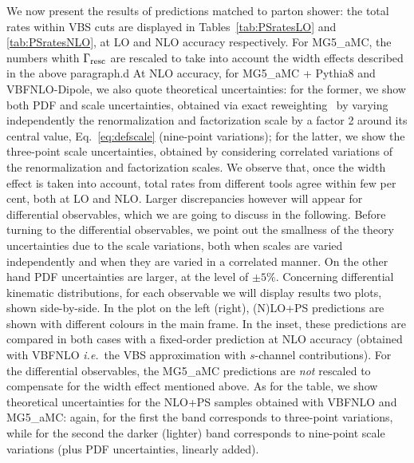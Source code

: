 We now present the results of predictions matched to parton shower: the total rates within VBS cuts are displayed in Tables~\ref{tab:PSratesLO} and
\ref{tab:PSratesNLO}, at LO and NLO
accuracy respectively. For {\sc MG5\_aMC}, 
the numbers whith $\Gamma_{\rm resc}$ are rescaled to 
take into account the width effects described in the above paragraph.d  At NLO accuracy, for {\sc MG5\_aMC} + {\sc Pythia8} and {\sc VBFNLO}-{\sc Dipole}, we also quote
theoretical uncertainties: for the former, we show both PDF and scale uncertainties, obtained via exact reweighting~\cite{Frederix:2011ss} by varying independently the renormalization and factorization
scale by a factor 2 around its central value, Eq.~\ref{eq:defscale} (nine-point variations); for the latter, we show the 
three-point scale uncertainties, obtained by considering correlated variations of the renormalization and factorization scales. 
We observe that, once the width effect is taken into
account, total rates from different tools agree within few per cent, both at LO and NLO. Larger discrepancies however will appear for differential observables, which we are going to discuss in
the following. Before turning to the differential observables, we point out the smallness of the theory uncertainties due to the scale variations, both when
scales are varied independently and when they are varied in a correlated manner. On the other hand PDF uncertainties are larger, at the level of 
$\pm 5\%$. Concerning differential kinematic distributions, for each observable we will display results two plots, shown side-by-side. In the plot on the left (right), (N)LO+PS predictions are shown
with different colours in the main frame. In the inset, these predictions are compared in both cases with a fixed-order prediction at NLO accuracy (obtained with
{\sc VBFNLO} \emph{i.e.}\ the VBS approximation with $s$-channel contributions). For the differential observables, the {\sc MG5\_aMC} predictions are \emph{not} rescaled to compensate for the width effect mentioned above. As for the table, we show theoretical uncertainties for the NLO+PS samples
obtained with {\sc VBFNLO} and {\sc MG5\_aMC}: 
again, for the first the band corresponds to three-point variations, while for the second the darker (lighter) band corresponds to nine-point 
scale variations (plus PDF uncertainties, linearly added). 


